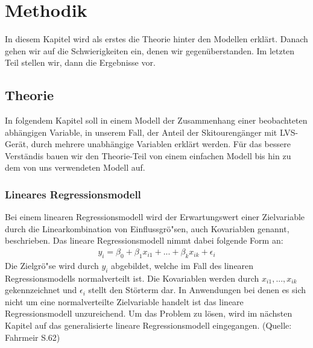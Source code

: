 \documentclass[12pt]{scrreprt}
\begin{document}
	
	\pagestyle{myheadings}

\chapter{Methodik}
In diesem Kapitel wird als erstes die Theorie hinter den Modellen erklärt. Danach gehen wir auf die Schwierigkeiten ein, denen wir gegenüberstanden. Im letzten Teil stellen wir, dann die Ergebnisse vor.
\section{Theorie}
In folgendem Kapitel soll in einem Modell der Zusammenhang einer beobachteten abhängigen Variable, in unserem Fall, der Anteil der Skitourengänger mit LVS-Gerät, durch mehrere unabhängige Variablen erklärt werden.
Für das bessere Verständis bauen wir den Theorie-Teil von einem einfachen Modell bis hin zu dem von uns verwendeten Modell auf.
\subsection{Lineares Regressionsmodell}
Bei einem linearen Regressionsmodell wird der Erwartungswert einer Zielvariable durch die Linearkombination von Einflussgrö"sen, auch Kovariablen genannt, beschrieben. Das lineare Regressionsmodell nimmt dabei folgende Form an:
\begin{align}
y_{i}= \beta_{0}+\beta_{1}x_{i1}+...+\beta_{k}x_{ik}+\epsilon_{i}
\end{align}
Die Zielgrö"se wird durch $y_{i}$ abgebildet, welche im Fall des linearen Regressionsmodells normalverteilt ist. Die Kovariablen werden durch $x_{i1},...,x_{ik}$ gekennzeichnet und $\epsilon_{i}$ stellt den Störterm dar. In Anwendungen bei denen es sich nicht um eine normalverteilte Zielvariable handelt ist das lineare Regressionsmodell unzureichend. Um das Problem zu lösen, wird im nächsten Kapitel auf das generalisierte lineare Regressionsmodell eingegangen. (Quelle: Fahrmeir S.62)
\end{document}
